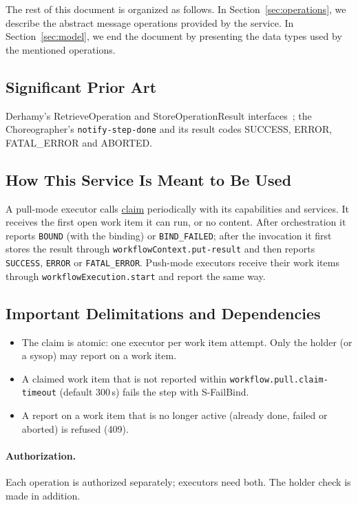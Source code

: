 \documentclass[a4paper]{arrowhead}
\newcommand{\oref}[1]{{\textcolor{ArrowheadBlue}{\hyperref[sec:operations:#1]{#1}}}}
\begin{document}
The rest of this document is organized as follows.
In Section~\ref{sec:operations}, we describe the abstract message operations provided by the service.
In Section~\ref{sec:model}, we end the document by presenting the data types used by the mentioned operations.

\subsection{Significant Prior Art}
Derhamy's RetrieveOperation and StoreOperationResult interfaces~\cite{derhamy2018workflow}; the
Choreographer's \texttt{notify-step-done} and its result codes SUCCESS, ERROR, FATAL\_ERROR and ABORTED.

\subsection{How This Service Is Meant to Be Used}
A pull-mode executor calls \oref{claim} periodically with its capabilities and services. It receives the
first open work item it can run, or no content. After orchestration it reports \texttt{BOUND} (with the binding) or
\texttt{BIND\_FAILED}; after the invocation it first stores the result through \texttt{workflowContext.put-result} and
then reports \texttt{SUCCESS}, \texttt{ERROR} or \texttt{FATAL\_ERROR}. Push-mode executors receive their work items
through \texttt{workflowExecution.start} and report the same way.

\subsection{Important Delimitations and Dependencies}
\label{sec:delimitations}
\begin{itemize}
\item The claim is atomic: one executor per work item attempt. Only the holder (or a sysop) may report on a work item.
\item A claimed work item that is not reported within \texttt{workflow.pull.claim-timeout} (default 300\,s) fails the step with S-FailBind.
\item A report on a work item that is no longer active (already done, failed or aborted) is refused (409).
\end{itemize}

\paragraph{Authorization.} Each operation is authorized separately; executors need both. The holder check is made in addition.
\end{document}
